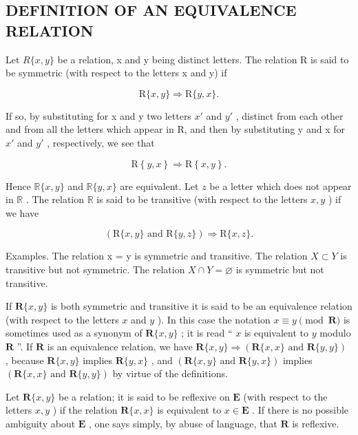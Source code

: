 \subsection{DEFINITION OF AN EQUIVALENCE RELATION}

Let \(R\{x, y\}\) be a relation, x and y being distinct letters. The relation R is said to be symmetric (with respect to the letters x and y) if

\[
\mathrm{R} \{x, y \} \Longrightarrow \mathrm{R} \{y, x \}.
\]

If so, by substituting for x and y two letters \(x'\) and \(y'\) , distinct from each other and from all the letters which appear in R, and then by substituting y and x for \(x'\) and \(y'\) , respectively, we see that

\[
\mathrm{R} \left\{y, x \right\} \Longrightarrow \mathrm{R} \left\{x, y \right\}.
\]

Hence \(\mathbb{R}\{x, y\}\) and \(\mathbb{R}\{y, x\}\) are equivalent. Let \(z\) be a letter which does not appear in \(\mathbb{R}\) . The relation \(\mathbb{R}\) is said to be transitive (with respect to the letters \(x, y\) ) if we have

\[
(\mathrm{R} \{x, y \} \text {   and   } \mathrm{R} \{y, z \}) \Longrightarrow \mathrm{R} \{x, z \}.
\]

Examples. The relation x = y is symmetric and transitive. The relation \(X \subset Y\) is transitive but not symmetric. The relation \(X \cap Y = \varnothing\) is symmetric but not transitive.

If \(\mathbf{R}\{x, y\}\) is both symmetric and transitive it is said to be an equivalence relation (with respect to the letters \(x\) and \(y\) ). In this case the notation \(x \equiv y \pmod{\mathbf{R}}\) is sometimes used as a synonym of \(\mathbf{R}\{x, y\}\) ; it is read `` \(x\) is equivalent to \(y\) modulo \(\mathbf{R}\) ''. If \(\mathbf{R}\) is an equivalence relation, we have \(\mathbf{R}\{x, y\} \Longrightarrow (\mathbf{R}\{x, x\} \text{ and } \mathbf{R}\{y, y\})\) , because \(\mathbf{R}\{x, y\}\) implies \(\mathbf{R}\{y, x\}\) , and \((\mathbf{R}\{x, y\} \text{ and } \mathbf{R}\{y, x\})\) implies \((\mathbf{R}\{x, x\} \text{ and } \mathbf{R}\{y, y\})\) by virtue of the definitions.

Let \(\mathbf{R}\{x, y\}\) be a relation; it is said to be reflexive on \(\mathbf{E}\) (with respect to the letters \(x, y\) ) if the relation \(\mathbf{R}\{x, x\}\) is equivalent to \(x \in \mathbf{E}\) . If there is no possible ambiguity about \(\mathbf{E}\) , one says simply, by abuse of language, that \(\mathbf{R}\) is reflexive.

